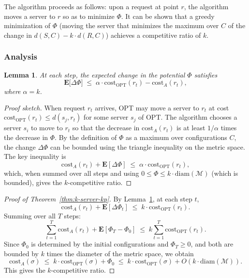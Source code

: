 \documentclass[twoside,12pt]{book}
\theoremstyle{plain}
\newtheorem{lemma}[theorem]{Lemma}
\theoremstyle{definition}
\theoremstyle{remark}
\begin{document}
The algorithm proceeds as follows: upon a request at point $r$, the
algorithm moves a server to $r$ so as to minimize $\Phi$.  It can be
shown that a greedy minimization of $\Phi$ (moving the server that
minimizes the maximum over $C$ of the change in $d(S,C) - k \cdot
d(R,C)$) achieves a competitive ratio of $k$.

\subsubsection{Analysis}

\begin{lemma}\label{lem:kp-step}
At each step, the expected change in the potential $\Phi$ satisfies
\[
  \mathbf{E}\!\bigl[\Delta\Phi\bigr] \;\le\; \alpha \cdot \mathrm{cost}_{\mathrm{OPT}}(r_t) - \mathrm{cost}_A(r_t),
\]
where $\alpha = k$.
\end{lemma}

\begin{proof}[Proof sketch]
When request $r_t$ arrives, OPT may move a server to $r_t$ at cost
$\mathrm{cost}_{\mathrm{OPT}}(r_t) \le d(s_j, r_t)$ for some server
$s_j$ of OPT.  The algorithm chooses a server $s_i$ to move to $r_t$ so
that the decrease in $\mathrm{cost}_A(r_t)$ is at least $1/\alpha$ times
the decrease in $\Phi$.  By the definition of $\Phi$ as a maximum over
configurations $C$, the change $\Delta\Phi$ can be bounded using the
triangle inequality on the metric space.  The key inequality is
\[
  \mathrm{cost}_A(r_t) + \mathbf{E}[\Delta\Phi] \;\le\; \alpha \cdot \mathrm{cost}_{\mathrm{OPT}}(r_t),
\]
which, when summed over all steps and using $0 \le \Phi \le k \cdot
\mathrm{diam}(\mathcal{M})$ (which is bounded), gives the $k$-competitive
ratio.
\end{proof}

\begin{proof}[Proof of Theorem~\ref{thm:k-server-kp}]
By Lemma~\ref{lem:kp-step}, at each step $t$,
\[
  \mathrm{cost}_A(r_t) + \mathbf{E}[\Delta\Phi_t] \;\le\; k \cdot \mathrm{cost}_{\mathrm{OPT}}(r_t).
\]
Summing over all $T$ steps:
\[
  \sum_{t=1}^{T} \mathrm{cost}_A(r_t) + \mathbf{E}[\Phi_T - \Phi_0] \;\le\; k \sum_{t=1}^{T} \mathrm{cost}_{\mathrm{OPT}}(r_t).
\]
Since $\Phi_0$ is determined by the initial configurations and $\Phi_T \ge
0$, and both are bounded by $k$ times the diameter of the metric space,
we obtain
\[
  \mathrm{cost}_A(\sigma) \;\le\; k \cdot \mathrm{cost}_{\mathrm{OPT}}(\sigma) + \Phi_0 \;\le\; k \cdot \mathrm{cost}_{\mathrm{OPT}}(\sigma) + O(k \cdot \mathrm{diam}(\mathcal{M})).
\]
This gives the $k$-competitive ratio.
\end{proof}
\end{document}
